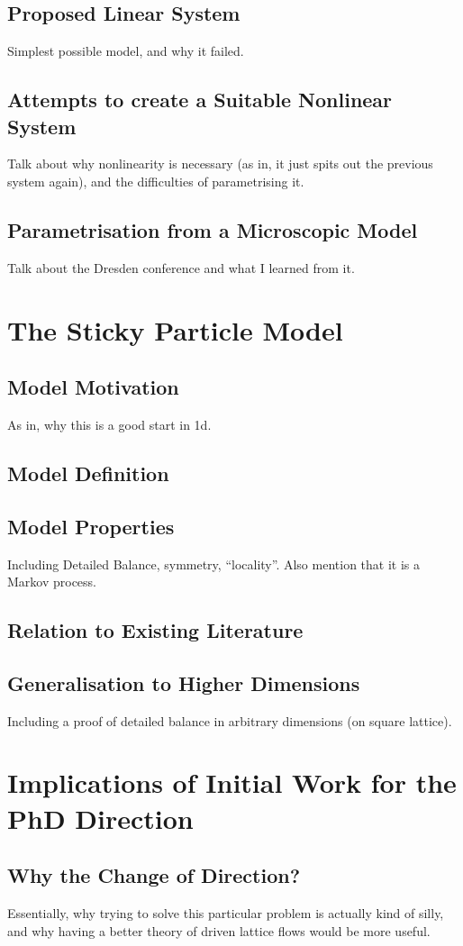 \subsection{Proposed Linear System}
Simplest possible model, and why it failed.
\subsection{Attempts to create a Suitable Nonlinear System}
Talk about why nonlinearity is necessary (as in, it just spits out the previous system again), and the difficulties of parametrising it.
\subsection{Parametrisation from a Microscopic Model}
Talk about the Dresden conference and what I learned from it.

\section{The Sticky Particle Model}
\subsection{Model Motivation}
As in, why this is a good start in 1d.
\subsection{Model Definition}
\subsection{Model Properties}
Including Detailed Balance, symmetry, ``locality''. Also mention that it is a Markov process.
\subsection{Relation to Existing Literature}
\subsection{Generalisation to Higher Dimensions}
Including a proof of detailed balance in arbitrary dimensions (on square lattice).

\section{Implications of Initial Work for the PhD Direction}
\subsection{Why the Change of Direction?}
Essentially, why trying to solve this particular problem is actually kind of silly, and why having a better theory of driven lattice flows would be more useful.
